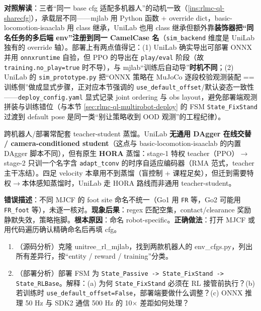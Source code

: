 \textbf{对照解读}：三者“同一 base cfg 适配多机器人”的动机一致（\cref{ins:rlmc-ql-sharecfg}），承载层不同——mjlab 用 Python 函数 + override dict，basic-locomotion-isaaclab 用 class 继承，UniLab 也用 class 继承但额外靠\textbf{装饰器把“同名任务的多后端 env”注册到同一 CamelCase 名}（\verb|sim_backend| 维度是 UniLab 独有的 override 轴）。部署上有两点值得记：(1) UniLab 确实导出可部署 ONNX 并用 \verb|onnxruntime| 自验，但 PPO 的导出在 \verb|play/eval| 阶段（故 \verb|training.no_play=true| 时不导），与 mjlab“训练后自动导”\textbf{时机不同}；(2) UniLab 的 \verb|sim_prototype.py| 把“ONNX 策略在 MuJoCo 逐段校验观测装配 == 训练侧”做成显式步骤，正对应本节强调的 \verb|use_default_offset|/默认姿态一致性——\verb|deploy_config.yaml| 显式记录 joint ordering 与 obs layout，避免部署端观测拼装与训练错位（与本节 \cref{sec:rlmc-ql-multirobot-deploy} 的 FSM \verb|State_FixStand| 过渡到 default pose 是同一类“别让策略收到 OOD 观测”的工程纪律）。

\begin{note}
跨机器人/部署常配套 teacher-student 蒸馏。UniLab \textbf{无通用 DAgger 在线交替 / camera-conditioned student}（这点与 basic-locomotion-isaaclab 的内置 DAgger 脚本不同），但有原生 \textbf{HORA} 蒸馏：stage-1 特权 teacher（PPO）$\to$ stage-2 只训一个名字含 \verb|adapt_tconv| 的时序自适应编码器（RMA 范式，teacher 主干冻结）。四足 velocity 本章用不到蒸馏（盲控制 + 课程足矣），但迁到需要特权$\to$本体感知蒸馏时，UniLab 走 HORA 路线而非通用 teacher-student。
\end{note}

\begin{pitfall}
\textbf{错误描述}：不同 MJCF 的 foot site 命名不统一（Go1 用 \verb|FR| 等，Go2 可能用 \verb|FR_foot| 等），未逐一核对。\textbf{现象后果}：regex 匹配空集，contact/clearance 奖励静默失效，策略拖脚。\textbf{根本原因}：命名 robot-specific。\textbf{正确做法}：打开 MJCF 或用代码遍历确认精确命名后再填 cfg。
\end{pitfall}

\begin{practice}[跨机器人]
\begin{enumerate}
\item （源码分析）克隆 unitree\_rl\_mjlab，找到两款机器人的 env\_cfgs.py，列出所有差异行，按“entity / reward / training”分类。
\item （部署分析）部署 FSM 为 \verb|State_Passive -> State_FixStand -> State_RLBase|。解释：(a) 为何 \verb|State_FixStand| 必须在 RL 接管前执行？(b) 若训练时 \verb|use_default_offset=False|，部署端要做什么调整？(c) ONNX 推理 50 Hz 与 SDK2 通信 500 Hz 的 10$\times$ 差距如何处理？
\end{enumerate}
\end{practice}

